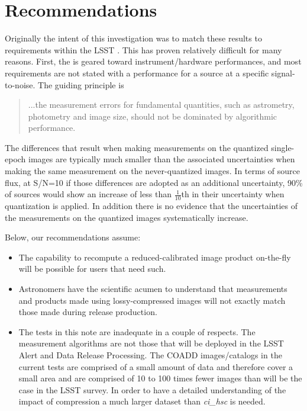 \clearpage

\section{Recommendations}

Originally the intent of this investigation was to match these results to requirements within the 
LSST \SRD {}.  This has proven relatively difficult for many reasons.
First, the \SRD is geared toward instrument/hardware performances, and most requirements are not 
stated with a performance for a source at a specific signal-to-noise.  The guiding principle is
\begin{quote} ...the measurement errors for fundamental quantities, 
such as astrometry, photometry and image size, should not be dominated by algorithmic performance.
\end{quote}
The differences that result when making measurements on the quantized single-epoch images are typically 
much smaller than the associated uncertainties when making the same measurement on the never-quantized
images.  In terms of source flux, at S/N=10 if those differences are adopted as an additional uncertainty, 
90\% of sources would show an increase of less than $\frac{1}{10}$th in their uncertainty when quantization 
is applied.  In addition there is no evidence that the uncertainties of the measurements on the quantized 
images systematically increase.

Below, our recommendations assume:
\begin{itemize}

\item The capability to recompute a reduced-calibrated image product on-the-fly will be 
possible for users that need such.

\item Astronomers have the scientific acumen to understand that measurements and products 
made using lossy-compressed images will not exactly match those made during release production.

\item The tests in this note are inadequate in a couple of respects.  The measurement
algorithms are not those that will be deployed in the LSST Alert and Data Release Processing.
The COADD images/catalogs in the current tests are comprised of a small amount of data
and therefore cover a small area and are comprised of 10 to 100 times fewer images than 
will be the case in the LSST survey.  In order to have a detailed understanding
of the impact of compression a much larger dataset than {\it ci\_hsc} is needed.

\end{itemize}


